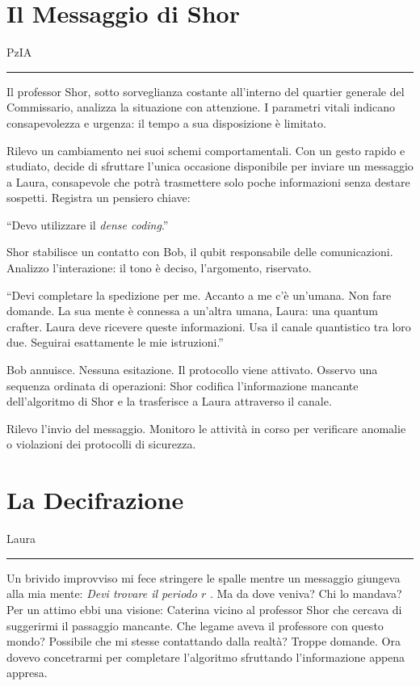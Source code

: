 \section{Il Messaggio di Shor}
\vspace{1em}
\begin{center}PzIA\end{center}
\hrule
\vspace{1em}

Il professor Shor, sotto sorveglianza costante all'interno del quartier generale del Commissario, analizza la situazione con attenzione. I parametri vitali indicano consapevolezza e urgenza: il tempo a sua disposizione è limitato.

Rilevo un cambiamento nei suoi schemi comportamentali. Con un gesto rapido e studiato, decide di sfruttare l'unica occasione disponibile per inviare un messaggio a Laura, consapevole che potrà trasmettere solo poche informazioni senza destare sospetti. Registra un pensiero chiave:

\enquote{Devo utilizzare il \textit{dense coding}.}

Shor stabilisce un contatto con Bob, il qubit responsabile delle comunicazioni. Analizzo l'interazione: il tono è deciso, l'argomento, riservato.

\enquote{Devi completare la spedizione per me. Accanto a me c'è un'umana. Non fare domande. La sua mente è connessa a un'altra umana, Laura: una quantum crafter. Laura deve ricevere queste informazioni. Usa il canale quantistico tra loro due. Seguirai esattamente le mie istruzioni.}

Bob annuisce. Nessuna esitazione. Il protocollo viene attivato. Osservo una sequenza ordinata di operazioni: Shor codifica l'informazione mancante dell'algoritmo di Shor e la trasferisce a Laura attraverso il canale.

Rilevo l'invio del messaggio. Monitoro le attività in corso per verificare anomalie o violazioni dei protocolli di sicurezza.


\section{La Decifrazione}
\vspace{1em}
\begin{center}Laura\end{center}
\hrule
\vspace{1em}
Un brivido improvviso mi fece stringere le spalle mentre  un messaggio giungeva alla mia mente: \emph{Devi trovare il periodo \( r \) }.
 Ma da dove veniva? Chi lo mandava? Per un attimo ebbi una visione: Caterina vicino al professor Shor che cercava di suggerirmi il passaggio mancante. Che legame aveva il professore con questo mondo? Possibile che mi stesse contattando dalla realtà? Troppe domande. Ora dovevo concetrarmi per completare l'algoritmo sfruttando l'informazione appena appresa.

